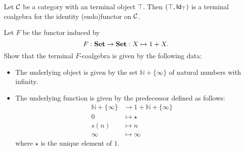 \begin{exer}\label{exer:terminalalg_for_idfun_with_terminalob} Let $\CC$ be a category with an terminal object $\top$. Then $(\top, \Id[\top])$ is a terminal coalgebra for the identity (endo)functor on $\CC$.
\end{exer}

\begin{exer} Let $F$ be the functor induced by 
\[
F:\SET\to\SET : X\mapsto 1 + X.
\]
Show that the terminal $F$-coalgebra is given by the following data:
\begin{itemize}
\item The underlying object is given by the set $\mathbb{N} + \{\infty\}$ of natural numbers with infinity.
\item The underlying function is given by the predecessor defined as follows: 
\begin{align*}
  \mathbb{N} + \{\infty\} &\to 1 + \mathbb{N} + \{\infty\}
  \\
  0 &\mapsto \star
  \\
  s(n) &\mapsto n
  \\
  \infty &\mapsto \infty
\end{align*}
where $\star$ is the unique element of $1$.
\end{itemize}
\end{exer}


